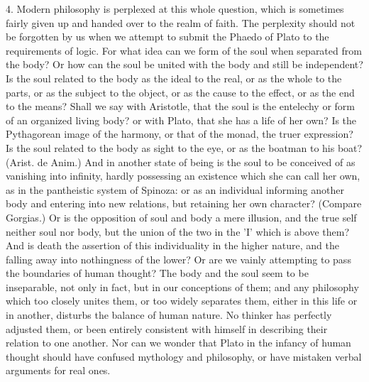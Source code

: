 4. Modern philosophy is perplexed at this whole question, which is
sometimes fairly given up and handed over to the realm of faith. The
perplexity should not be forgotten by us when we attempt to submit the
Phaedo of Plato to the requirements of logic. For what idea can we form of
the soul when separated from the body? Or how can the soul be united with
the body and still be independent? Is the soul related to the body as the
ideal to the real, or as the whole to the parts, or as the subject to the
object, or as the cause to the effect, or as the end to the means? Shall
we say with Aristotle, that the soul is the entelechy or form of an
organized living body? or with Plato, that she has a life of her own? Is
the Pythagorean image of the harmony, or that of the monad, the truer
expression? Is the soul related to the body as sight to the eye, or as the
boatman to his boat? (Arist. de Anim.) And in another state of being is
the soul to be conceived of as vanishing into infinity, hardly possessing
an existence which she can call her own, as in the pantheistic system of
Spinoza: or as an individual informing another body and entering into new
relations, but retaining her own character? (Compare Gorgias.) Or is the
opposition of soul and body a mere illusion, and the true self neither
soul nor body, but the union of the two in the 'I' which is above them?
And is death the assertion of this individuality in the higher nature, and
the falling away into nothingness of the lower? Or are we vainly
attempting to pass the boundaries of human thought? The body and the soul
seem to be inseparable, not only in fact, but in our conceptions of them;
and any philosophy which too closely unites them, or too widely separates
them, either in this life or in another, disturbs the balance of human
nature. No thinker has perfectly adjusted them, or been entirely
consistent with himself in describing their relation to one another. Nor
can we wonder that Plato in the infancy of human thought should have
confused mythology and philosophy, or have mistaken verbal arguments for
real ones.

